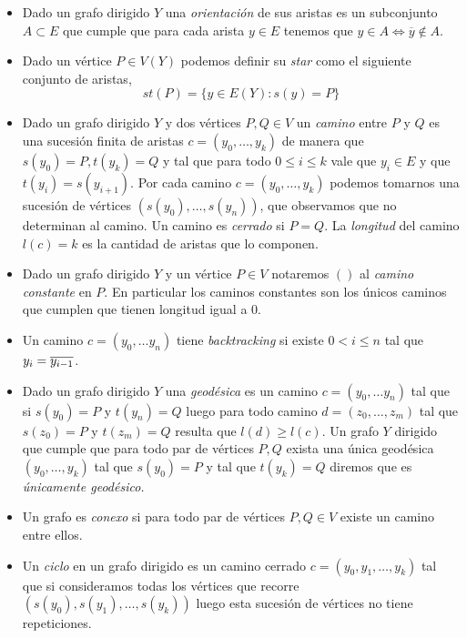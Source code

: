 \documentclass[tesis.tex]{subfiles}
\begin{document}
\begin{deff}
\begin{itemize}
		\item Dado un grafo dirigido $Y$ una \emph{orientación} de sus aristas es un subconjunto $A \subset E$ que cumple que para cada arista $y \in E$ tenemos que $y \in A \iff \overline y \notin A$.	
		
		\item Dado un vértice $P \in V(Y)$ podemos definir su \emph{star} como el siguiente conjunto de aristas,
		\[
		st(P) = \{  y \in E(Y) : s(y) = P  \}
		\]
		
		\item Dado un grafo dirigido $Y$ y dos vértices $P, Q \in V$ un \emph{camino}  entre $P$ y $Q$ es una sucesión finita de aristas $c = (y_0, \dots, y_k)$ de manera que $s(y_0) = P, t(y_k) = Q$ y tal que para todo $0 \le i \le k$ vale que $y_i \in E$ y que $t(y_i) = s(y_{i+1})$.
		Por cada camino $c = (y_0, \dots, y_k)$ podemos tomarnos una sucesión de vértices $(s(y_{0}), \dots, s(y_{n}))$, que observamos que no determinan al camino.
		Un camino es \emph{cerrado} si $P = Q$.
		La \emph{longitud} del camino $l(c) = k$ es la cantidad de aristas que lo componen.
		
		\item Dado un grafo dirigido $Y$ y un vértice $P \in V$ notaremos $()$ al \emph{camino constante} en $P$. 
		En particular los caminos constantes son los únicos caminos que cumplen que tienen longitud igual a $0$.

		\item Un camino $c= (y_0, \dots y_n)$ tiene \emph{backtracking} si existe $ 0 < i \le n$ tal que $y_i = \overline{y_{i-1}}$.		
		
		\item Dado un grafo dirigido $Y$ una \emph{geodésica} es un camino $c = (y_0, \dots y_n)$ tal que si $s(y_0)=P$ y $t(y_n)=Q$ luego para todo camino $d = (z_0, \dots, z_m)$ tal que $s(z_0) = P$ y $t(z_m) = Q$ resulta que $l(d) \ge l(c)$.
		Un grafo $Y$ dirigido que cumple que para todo par de vértices $P,Q$ exista una única geodésica $(y_0, \dots, y_k)$ tal que $s(y_0) = P$ y tal que $t(y_k) = Q$ diremos que es \emph{únicamente geodésico.}
		
		\item 	Un grafo es \emph{conexo} si para todo par de vértices $P, Q \in V$ existe un camino entre ellos.
		
		
		\item Un \emph{ciclo} en un grafo dirigido es un camino cerrado $c = (y_0, y_1, \dots, y_k)$ tal que si consideramos todas los vértices que recorre $(s(y_0),s(y_{1}), \dots, s(y_{k}))$ luego esta sucesión de vértices no tiene repeticiones.
		

\end{itemize}
\end{deff}
\end{document}
